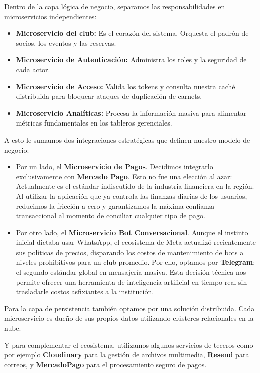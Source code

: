 Dentro de la capa lógica de negocio, separamos las responsabilidades en microservicios independientes:
\begin{itemize}
    \item \textbf{Microservicio del club:} Es el corazón del sistema. Orquesta el padrón de socios, los eventos y las reservas.
    \item \textbf{Microservicio de Autenticación:} Administra los roles y la seguridad de cada actor.
    \item \textbf{Microservicio de Acceso:} Valida los tokens y consulta nuestra caché distribuida para bloquear ataques de duplicación de carnets.
    \item \textbf{Microservicio Analíticas:} Procesa la información masiva para alimentar métricas fundamentales en los tableros gerenciales.
\end{itemize}

\newpage

A esto le sumamos dos integraciones estratégicas que definen nuestro modelo de negocio:
\begin{itemize}
    \item Por un lado, el \textbf{Microservicio de Pagos}. Decidimos integrarlo exclusivamente con \textbf{Mercado Pago}. Esto no fue una elección al azar: Actualmente es el estándar indiscutido de la industria financiera en la región. Al utilizar la aplicación que ya controla las finanzas diarias de los usuarios, reducimos la fricción a cero y garantizamos la máxima confianza transaccional al momento de conciliar cualquier tipo de pago.
    \item Por otro lado, el \textbf{Microservicio Bot Conversacional}. Aunque el instinto inicial dictaba usar WhatsApp, el ecosistema de Meta actualizó recientemente sus políticas de precios, disparando los costos de mantenimiento de bots a niveles prohibitivos para un club promedio. Por ello, optamos por \textbf{Telegram}: el segundo estándar global en mensajería masiva. Esta decisión técnica nos permite ofrecer una herramienta de inteligencia artificial en tiempo real sin trasladarle costos asfixiantes a la institución.
\end{itemize}

Para la capa de persistencia también optamos por una solución distribuida. Cada microservicio es dueño de sus propios datos utilizando clústeres relacionales en la nube.

Y para complementar el ecosistema, utilizamos algunos servicios de teceros como por ejemplo \textbf{Cloudinary} para la gestión de archivos multimedia, \textbf{Resend} para correos, y \textbf{MercadoPago} para el procesamiento seguro de pagos.

